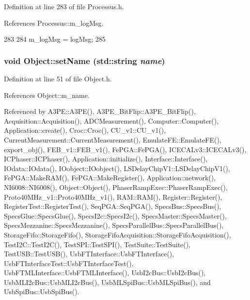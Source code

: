 Definition at line 283 of file Processus.h.

References Processus::m\_\-logMsg.


\begin{DoxyCode}
283                                     {
284     m_logMsg = logMsg;
285   }
\end{DoxyCode}
\hypertarget{classObject_ae30fea75683c2d149b6b6d17c09ecd0c}{
\subsubsection[{setName}]{\setlength{\rightskip}{0pt plus 5cm}void Object::setName (std::string {\em name})}}
\label{classObject_ae30fea75683c2d149b6b6d17c09ecd0c}


Definition at line 51 of file Object.h.

References Object::m\_\-name.

Referenced by A3PE::A3PE(), A3PE\_\-BitFlip::A3PE\_\-BitFlip(), Acquisition::Acquisition(), ADCMeasurement(), Computer::Computer(), Application::create(), Croc::Croc(), CU\_\-v1::CU\_\-v1(), CurrentMeasurement::CurrentMeasurement(), EmulateFE::EmulateFE(), export\_\-obj(), FEB\_\-v1::FEB\_\-v1(), FePGA::FePGA(), ICECALv3::ICECALv3(), ICPhaser::ICPhaser(), Application::initialize(), Interface::Interface(), IOdata::IOdata(), IOobject::IOobject(), LSDelayChipV1::LSDelayChipV1(), FePGA::MakeRAM(), FePGA::MakeRegister(), Application::network(), NI6008::NI6008(), Object::Object(), PhaserRampExec::PhaserRampExec(), Proto40MHz\_\-v1::Proto40MHz\_\-v1(), RAM::RAM(), Register::Register(), RegisterTest::RegisterTest(), SeqPGA::SeqPGA(), SpecsBus::SpecsBus(), SpecsGlue::SpecsGlue(), SpecsI2c::SpecsI2c(), SpecsMaster::SpecsMaster(), SpecsMezzanine::SpecsMezzanine(), SpecsParallelBus::SpecsParallelBus(), StorageFifo::StorageFifo(), StorageFifoAcquisition::StorageFifoAcquisition(), TestI2C::TestI2C(), TestSPI::TestSPI(), TestSuite::TestSuite(), TestUSB::TestUSB(), UsbFTInterface::UsbFTInterface(), UsbFTInterfaceTest::UsbFTInterfaceTest(), UsbFTMLInterface::UsbFTMLInterface(), UsbI2cBus::UsbI2cBus(), UsbMLI2cBus::UsbMLI2cBus(), UsbMLSpiBus::UsbMLSpiBus(), and UsbSpiBus::UsbSpiBus().


